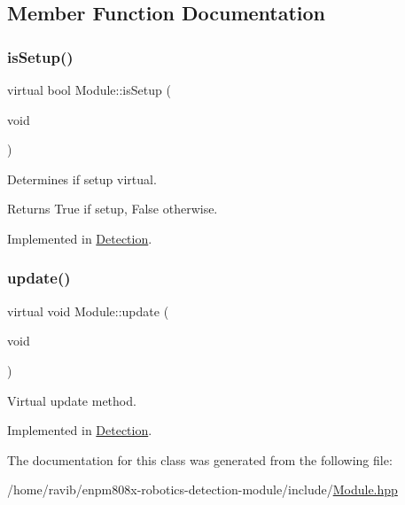 \subsection{Member Function Documentation}
\mbox{\label{class_module_a20fb30b0bf6ea415e93efbbacc68043c}} 
\subsubsection{\texorpdfstring{is\+Setup()}{isSetup()}}
{\footnotesize\ttfamily virtual bool Module\+::is\+Setup (\begin{DoxyParamCaption}\item[{void}]{ }\end{DoxyParamCaption})\hspace{0.3cm}{\ttfamily [pure virtual]}}



Determines if setup virtual. 

\begin{DoxyReturn}{Returns}
True if setup, False otherwise. 
\end{DoxyReturn}


Implemented in \hyperlink{class_detection_a3a657b6943cacfd4bdd55d90def58427}{Detection}.

\mbox{\label{class_module_a21af40d45926cf90d6573f5ac5a1149f}} 
\subsubsection{\texorpdfstring{update()}{update()}}
{\footnotesize\ttfamily virtual void Module\+::update (\begin{DoxyParamCaption}\item[{void}]{ }\end{DoxyParamCaption})\hspace{0.3cm}{\ttfamily [pure virtual]}}



Virtual update method. 



Implemented in \hyperlink{class_detection_a5a959a3e87c5cfba1ae5a78429df6b5c}{Detection}.



The documentation for this class was generated from the following file\+:\begin{DoxyCompactItemize}
\item 
/home/ravib/enpm808x-\/robotics-\/detection-\/module/include/\hyperlink{_module_8hpp}{Module.\+hpp}\end{DoxyCompactItemize}
